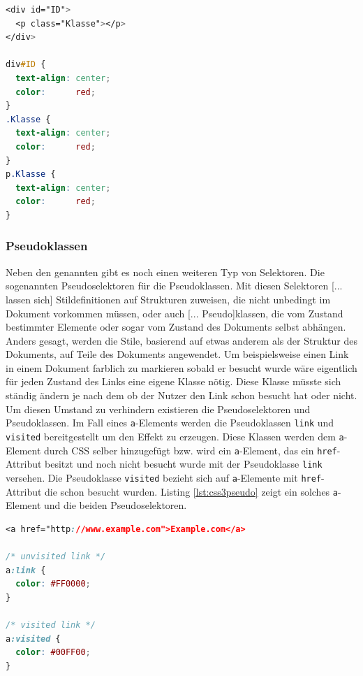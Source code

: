 \vspace{1em}
\begin{lstlisting}[language=CSS, caption=CSS3 Klassen- und ID-Selektoren, label=lst:css3idclass]
<div id="ID">
  <p class="Klasse"></p>
</div>

div#ID {
  text-align: center;
  color:      red;
}
.Klasse {
  text-align: center;
  color:      red;
}
p.Klasse {
  text-align: center;
  color:      red;
}
\end{lstlisting}
	
\subsubsection{Pseudoklassen} Neben den genannten gibt es noch einen weiteren Typ von Selektoren. Die sogenannten Pseudoselektoren für die Pseudoklassen. \glqq Mit diesen Selektoren [... lassen sich] Stildefinitionen auf Strukturen zuweisen, die nicht unbedingt im Dokument vorkommen müssen, oder auch [... Pseudo]klassen, die vom Zustand bestimmter Elemente oder sogar vom Zustand des Dokuments selbst abhängen. Anders gesagt, werden die Stile, basierend auf etwas anderem als der Struktur des Dokuments, auf Teile des Dokuments angewendet.\grqq{}\cite[S.53ff]{MeyeCasc2005} Um beispielsweise einen Link in einem Dokument farblich zu markieren sobald er besucht wurde wäre eigentlich für jeden Zustand des Links eine eigene Klasse nötig. Diese Klasse müsste sich ständig ändern je nach dem ob der Nutzer den Link schon besucht hat oder nicht. Um diesen Umstand zu verhindern existieren die Pseudoselektoren und Pseudoklassen. Im Fall eines \texttt{a}-Elements werden die Pseudoklassen \texttt{link} und \texttt{visited} bereitgestellt um den Effekt zu erzeugen. Diese Klassen werden dem \texttt{a}-Element durch CSS selber hinzugefügt bzw. wird ein \texttt{a}-Element, das ein \texttt{href}-Attribut besitzt und noch nicht besucht wurde mit der Pseudoklasse \texttt{link} versehen. Die Pseudoklasse \texttt{visited} bezieht sich auf \texttt{a}-Elemente mit \texttt{href}-Attribut die schon besucht wurden. Listing \ref{lst:css3pseudo} zeigt ein solches \texttt{a}-Element und die beiden Pseudoselektoren.

\vspace{1em}
\begin{lstlisting}[language=CSS, caption=CSS3 Pseudoklassen und -selektoren, label=lst:css3pseudo]
<a href="http://www.example.com">Example.com</a>

/* unvisited link */
a:link {
  color: #FF0000;
}

/* visited link */
a:visited {
  color: #00FF00;
}
\end{lstlisting}

